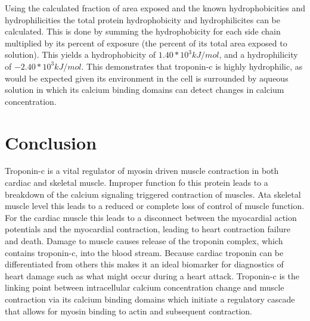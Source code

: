 \documentclass[12pt]{article}
\begin{document}
	Using the calculated fraction of area exposed and the known hydrophobicities and hydrophilicities the total protein hydrophobicity and hydrophilicites can be calculated. This is done by summing the hydrophobicity for each side chain multiplied by its percent of exposure (the percent of its total area exposed to solution). This yields a hydrophobicity of $1.40*10^3 kJ/mol$, and a hydrophilicity of $-2.40*10^3 kJ/mol$. This demonstrates that troponin-c is highly hydrophilic, as would be expected given its environment in the cell is surrounded by aqueous solution in which its calcium binding domains can detect changes in calcium concentration.
	
	
	
	
	\section{Conclusion}
	Troponin-c is a vital regulator of myosin driven muscle contraction in both cardiac and skeletal muscle. Improper function fo this protein leads to a breakdown of the calcium signaling triggered contraction of muscles. Ata skeletal muscle level this leads to a reduced or complete loss of control of muscle function. For the cardiac muscle this leads to a disconnect between the myocardial action potentials and the myocardial contraction, leading to heart contraction failure and death. Damage to muscle causes release of the troponin complex, which contains troponin-c, into the blood stream. Because cardiac troponin can be differentiated from others this makes it an ideal biomarker for diagnostics of heart damage such as what might occur during a heart attack. Troponin-c is the linking point between intracellular calcium concentration change and muscle contraction via its calcium binding domains which initiate a regulatory cascade that allows for myosin binding to actin and subsequent contraction.
	
	
	
	
	
\end{document}
